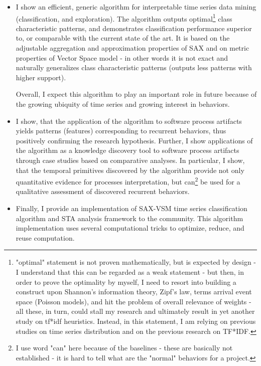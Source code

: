 \documentclass[12pt,oneside]{article}
\numberwithin{equation}{subsection}
\begin{document}
\begin{itemize}

\item 
I show an efficient, generic algorithm for interpretable time series data mining (classification,
and exploration). The algorithm outputs optimal\footnote{"optimal" statement is not proven
mathematically, but is expected by design - I understand that this can be regarded as a weak
statement - but then, in order to prove the optimality by myself, I need to resort into building a
construct upon Shannon's information theory, Zipf's law, terms arrival event space (Poisson models),
and hit the problem of overall relevance of weights - all these, in turn, could stall my research
and ultimately result in yet another study on tf*idf heuristics. Instead, in this statement, I am
relying on previous studies on time series distribution and on the previous research on TF*IDF.}
class characteristic patterns, and demonstrates classification performance superior to, or comparable
with the current state of the art. It is based on the adjustable aggregation and
approximation properties of SAX and on metric properties of Vector Space model - in other words it
is not exact and naturally generalizes class characteristic patterns (outputs less patterns with
higher support). 

Overall, I expect this algorithm to play an important role in future because of the growing ubiquity
of time series and growing interest in behaviors.

\item 
I show, that the application of the algorithm to software process artifacts yields patterns
(features) corresponding to recurrent behaviors, thus positively confirming the research
hypothesis. Further, I show applications of the algorithm as a knowledge discovery tool to software
process artifacts through case studies based on comparative analyses. In particular, I show, that
the temporal primitives discovered by the algorithm provide not only quantitative evidence for
processes interpretation, but can\footnote{ I use word "can" here because of the baselines - these
are basically not established - it is hard to tell what are the "normal" behaviors for a project.} 
be used for a qualitative assessment of discovered recurrent behaviors.

\item 
Finally, I provide an implementation of SAX-VSM time series classification algorithm and STA
analysis framework to the community. This algorithm implementation uses several computational
tricks to optimize, reduce, and reuse computation. 
\end{itemize}
\end{document}
